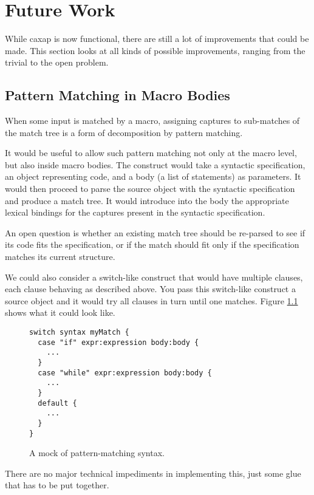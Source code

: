 \chapter{Future Work}
\label{future_work}

While caxap is now functional, there are still a lot of improvements that could
be made. This section looks at all kinds of possible improvements, ranging from
the trivial to the open problem.

\section{Pattern Matching in Macro Bodies}

When some input is matched by a macro, assigning captures to sub-matches of the
match tree is a form of decomposition by pattern matching.

It would be useful to allow such pattern matching not only at the macro level,
but also inside macro bodies. The construct would take a syntactic
specification, an object representing code, and a body (a list of statements) as
parameters. It would then proceed to parse the source object with the syntactic
specification and produce a match tree. It would introduce into the body the
appropriate lexical bindings for the captures present in the syntactic
specification.

An open question is whether an existing match tree should be re-parsed to see if
its code fits the specification, or if the match should fit only if the
specification matches its current structure.

We could also consider a switch-like construct that would have multiple clauses,
each clause behaving as described above. You pass this switch-like construct a
source object and it would try all clauses in turn until one matches. Figure
\ref{pattern_mock} shows what it could look like.

\begin{figure}[here]
\small
\begin{lstlisting}[frame=single,language=caxap]
switch syntax myMatch {
  case "if" expr:expression body:body {
    ...
  }
  case "while" expr:expression body:body {
    ...
  }
  default {
    ...
  }
}
\end{lstlisting}
\caption{A mock of pattern-matching syntax.}
\label{pattern_mock}
\end{figure}

There are no major technical impediments in implementing this, just some glue
that has to be put together.

